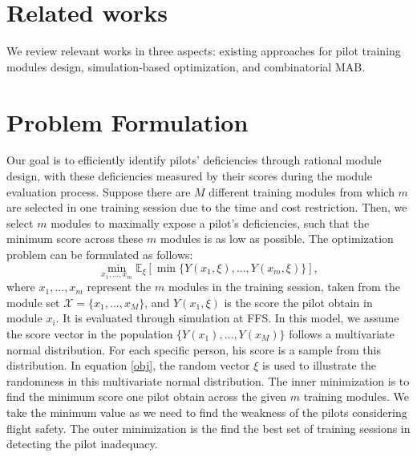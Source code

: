 \documentclass[opre,sglanonrev]{informs4}
\begin{document}
\section{Related works}
\label{related works}
We review relevant works in three aspects: existing approaches for pilot training modules design, simulation-based optimization, and combinatorial MAB.

\section{Problem Formulation}
\label{problem formulation}
Our goal is to efficiently identify pilots’ deficiencies through rational module design, with these deficiencies measured by their scores during the module evaluation process. Suppose there are $M$ different training modules from which $m$ are selected in one training session due to the time and cost restriction. Then, we select $m$ modules to maximally expose a pilot’s deficiencies, such that the minimum score across these $m$ modules is as low as possible. The optimization problem can be formulated as follows:
\begin{equation}
	\min_{x_1,...,x_m} \mathbb{E}_\xi[\min\{Y(x_1,\xi),...,Y(x_m,\xi) \} ], 
	\label{obj}
\end{equation}
where $x_1,...,x_m$ represent the $m$ modules in the training session, taken from the module set $\mathcal{X} = \{x_1,...,x_M\}$, and $Y(x_1,\xi)$ is the score the pilot obtain in module $x_i$. It is evaluated through simulation at FFS. In this model, we assume the score vector in the population $\{Y(x_1),...,Y(x_M)\}$ follows a multivariate normal distribution. For each specific person, his score is a sample from this distribution. In equation \eqref{obj}, the random vector $\xi$ is used to illustrate the randomness in this multivariate normal distribution. The inner minimization is to find the minimum score one pilot obtain across the given $m$ training modules. We take the minimum value as we need to find the weakness of the pilots considering flight safety. The outer minimization is the find the best set of training sessions in detecting the pilot inadequacy.
\end{document}
